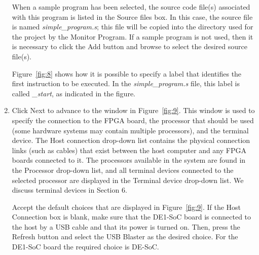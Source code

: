 \documentclass[11pt, twoside, pdftex]{article}
\begin{document}
\begin{enumerate}
When a sample program has been
selected, the source code file(s) associated with this program
is listed in the {\sf Source files} box.  In this case, the source file is named {\it simple\_program.s}; this
file will be copied into the directory used for the project by
the Monitor Program. 
If a sample program is not used, then it is necessary to click
the {\sf Add} button and browse to select the desired source 
file(s).

Figure~\ref{fig:8} shows how it is possible to specify a label
that identifies the first instruction to be executed. 
In the {\it simple\_program.s} file, this label is called 
{\it \_start}, as indicated in the figure.

\item 
Click {\sf Next} to advance to the window in Figure~\ref{fig:9}.
This window is used to specify the connection to the FPGA board, the processor that should be used (some hardware systems may
contain multiple processors), and the terminal device.
The {\sf Host connection} drop-down list contains the physical
connection links (such as cables) that exist between the host computer and any FPGA boards connected to it. 
The processors available in the system are found in the 
{\sf Processor} drop-down list, and all 
terminal devices connected to the selected processor are displayed in the {\sf Terminal device} drop-down list. 
We discuss terminal devices in Section 6.

Accept the default choices that are displayed in Figure~\ref{fig:9}. If the Host Connection box is blank, make sure that 
the DE1-SoC board is connected to the host by a USB cable and
that its power is turned on. Then, press the {\sf Refresh} button and select the USB Blaster as the desired choice.
For the DE1-SoC board the required choice is DE-SoC.


\end{enumerate}
\end{document}
